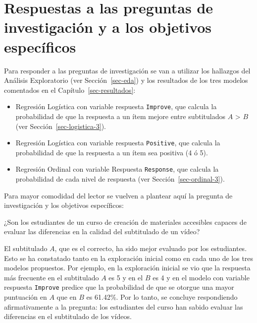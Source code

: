 \documentclass[
  12pt,
  a4paper,
  extrafontsizes,
  onecolumn,
  openright,
  table]{memoir}
\providecommand{\tightlist}{%
  \setlength{\itemsep}{0pt}\setlength{\parskip}{0pt}}\usepackage{longtable,booktabs,array}
\begin{document}
\hypertarget{respuestas-a-las-preguntas-de-investigaciuxf3n-y-a-los-objetivos-especuxedficos}{%
\section{Respuestas a las preguntas de investigación y a los objetivos
específicos}\label{respuestas-a-las-preguntas-de-investigaciuxf3n-y-a-los-objetivos-especuxedficos}}

Para responder a las preguntas de investigación se van a utilizar los
hallazgos del Análisis Exploratorio (ver Sección~\ref{sec-eda}) y los
resultados de los tres modelos comentados en el
Capítulo~\ref{sec-resultados}:

\begin{itemize}
\tightlist
\item
  \gls{Regresión Logística} con variable respuesta \texttt{Improve}, que
  calcula la probabilidad de que la respuesta a un ítem mejore entre
  subtitulados \(A\) \textgreater{} \(B\) \nobreak (ver
  Sección~\ref{sec-logistica-3}).
\item
  \gls{Regresión Logística} con variable respuesta \texttt{Positive},
  que calcula la probabilidad de que la respuesta a un ítem sea positiva
  (4 ó 5).
\item
  \gls{Regresión Ordinal} con variable Respuesta \texttt{Response}, que
  calcula la probabilidad de cada nivel de respuesta (ver
  Sección~\ref{sec-ordinal-3}).
\end{itemize}

Para mayor comodidad del lector se vuelven a plantear aquí la pregunta
de investigación y los objetivos específicos:

\begin{tcolorbox}[enhanced jigsaw, arc=.35mm, bottomrule=.15mm, left=2mm, colframe=quarto-callout-note-color-frame, coltitle=black, colback=white, rightrule=.15mm, opacityback=0, breakable, leftrule=.75mm, colbacktitle=quarto-callout-note-color!10!white, opacitybacktitle=0.6, bottomtitle=1mm, toptitle=1mm, titlerule=0mm, title=\textcolor{quarto-callout-note-color}{\faInfo}\hspace{0.5em}{Pregunta de investigación}, toprule=.15mm]

¿Son los estudiantes de un curso de creación de materiales accesibles
capaces de evaluar las diferencias en la calidad del subtitulado de un
vídeo?

\end{tcolorbox}

El subtitulado \(A\), que es el correcto, ha sido mejor evaluado por los
estudiantes. Esto se ha constatado tanto en la exploración inicial como
en cada uno de los tres modelos propuestos. Por ejemplo, en la
exploración inicial se vio que la respuesta más frecuente en el
subtitulado \(A\) es 5 y en el \(B\) es 4 y en el modelo con variable
respuesta \texttt{Improve} predice que la probabilidad de que se otorgue
una mayor puntuación en \(A\) que en \(B\) es 61.42\%. Por lo tanto, se
concluye respondiendo afirmativamente a la pregunta: los estudiantes del
curso han sabido evaluar las diferencias en el subtitulado de los
vídeos.
\end{document}
